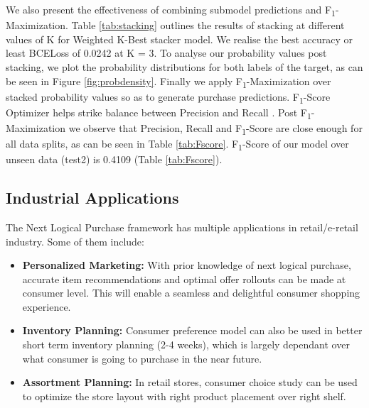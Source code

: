 We also present the effectiveness of combining submodel predictions and F\textsubscript{1}-Maximization. 
Table \ref{tab:stacking} outlines the results of stacking at different values of K for Weighted K-Best stacker model. 
We realise the best accuracy or least BCELoss of 0.0242 at K = 3.
To analyse our probability values post stacking, we plot the probability distributions for both labels of the target,
as can be seen in Figure \ref{fig:probdensity}.
Finally we apply F\textsubscript{1}-Maximization over stacked probability values so as to generate 
purchase predictions. F\textsubscript{1}-Score Optimizer helps strike
balance between Precision and Recall \cite{buckland1994relationship}. Post F\textsubscript{1}-Maximization we 
observe that Precision, Recall and F\textsubscript{1}-Score are close enough for all data splits, as can be seen 
in Table \ref{tab:Fscore}. F\textsubscript{1}-Score of our model over unseen data (test2) is 0.4109
(Table \ref{tab:Fscore}).
\subsection{Industrial Applications}
The Next Logical Purchase framework has multiple applications in retail/e-retail industry. Some of them 
include:
\begin{itemize}
\item {\bf Personalized Marketing:} With prior knowledge of next logical purchase, accurate item recommendations and 
optimal offer rollouts can be made at consumer level. This will enable a seamless and delightful consumer 
shopping experience.
\item {\bf Inventory Planning:} Consumer preference model can also be used in better short term inventory planning (2-4 weeks),
which is largely dependant over what consumer is going to purchase in the near future.
\item {\bf Assortment Planning:} In retail stores, consumer choice study can be used to optimize the store 
layout with right product placement over right shelf.
\end{itemize}

